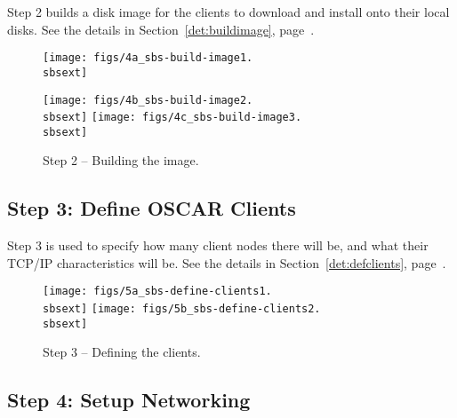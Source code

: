 Step 2 builds a disk image for the clients to download and install
onto their local disks.  See the details in
Section~\ref{det:buildimage}, page~\pageref{det:buildimage}.

\begin{figure}[h!]
  \begin{center}
    \centerline{\texttt{[image: figs/4a\_sbs-build-image1.\\sbsext]}}
    \vspace{\imgvskip}
    \centerline{
      \texttt{[image: figs/4b\_sbs-build-image2.\\sbsext]}
      \hspace{\imghskip}
      \texttt{[image: figs/4c\_sbs-build-image3.\\sbsext]}
      }
    \caption{Step 2 -- Building the image.}
    \label{fig:sbs-build-image}
  \end{center}
\end{figure}



\clearpage
\subsection{Step 3: Define OSCAR Clients}

Step 3 is used to specify how many client nodes there will be, and
what their TCP/IP characteristics will be.  See the details in
Section~\ref{det:defclients}, page~\pageref{det:defclients}.
 
\begin{figure}[ht!]
  \begin{center}
    \centerline{
      \texttt{[image: figs/5a\_sbs-define-clients1.\\sbsext]}
      \hspace{\imghskip}
      \texttt{[image: figs/5b\_sbs-define-clients2.\\sbsext]}
      }
    \caption{Step 3 -- Defining the clients.}
    \label{fig:sbs-define-clients}
  \end{center}
\end{figure}



\subsection{Step 4: Setup Networking}

